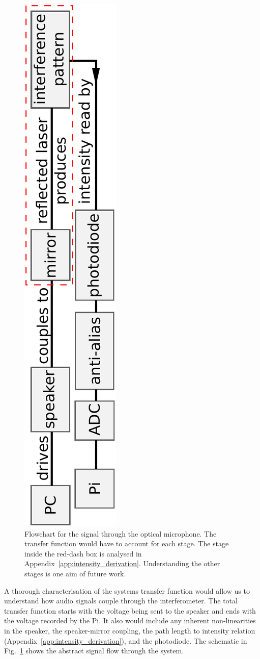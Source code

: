 \documentclass[paper-main.tex]{subfiles}
\begin{document}
\begin{figure}
	\includegraphics[height=.8\textwidth, angle=-90]{figures/pipeline.pdf}
	\caption{
Flowchart for the signal through the optical microphone. The transfer function would have to account for each stage. 
The stage inside the red-dash box is analysed in Appendix~\ref{app:intensity_derivation}. Understanding the other stages is one aim of future work. 
}
	\label{fig:pipeline_highlighted}
\end{figure}

A thorough characterisation of the systems transfer function would allow us to understand how audio signals couple through the interferometer. 
The total transfer function starts with the voltage being sent to the speaker and ends with the voltage recorded by the Pi. It also would include any inherent non-linearities in the speaker, the speaker-mirror coupling, the path length to intensity relation (Appendix~\ref{app:intensity_derivation}), and the photodiode. The schematic in Fig.~\ref{fig:pipeline_highlighted} shows the abstract signal flow through the system.
\end{document}

